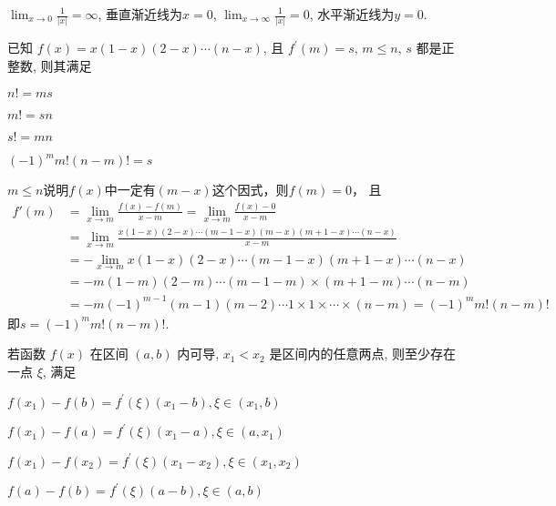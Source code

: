 \documentclass{USTBExam}
\begin{document}
\begin{analysis}
  $\lim _{x \to 0} \frac{1}{|x|} = \infty$, 垂直渐近线为$x=0$,
  $\lim _{x \to \infty} \frac{1}{|x|} = 0$, 水平渐近线为$y=0$.
\end{analysis}

\begin{problem}
  已知 $f(x)=x(1-x)(2-x) \cdots (n-x)$, 且 $f^{\prime}(m)=s$, $m \leq n$, $s$ 都是正整数, 则其满足
  \paren[D]
  \begin{choices}
    \item $n !=m s$
    \item $m !=s n$
    \item $s !=m n$
    \item $(-1)^{m} m !(n-m) !=s$
  \end{choices}
\end{problem}

\begin{analysis}
  $m \leq n$说明$f(x)$中一定有$(m-x)$这个因式，则$f(m) = 0$， 且
  \begin{align*}
    f'(m) & = \lim_{x \to m} \frac{f(x) - f(m)}{x - m}
    = \lim_{x \to m} \frac{f(x) - 0}{x - m}                                                    \\
          & = \lim_{x \to m} \frac{x(1-x)(2-x) \cdots (m-1-x)(m-x)(m+1-x) \cdots (n-x)}{x - m} \\
          & = - \lim_{x \to m} x(1-x)(2-x) \cdots (m-1-x) (m+1-x) \cdots (n-x)                 \\
          & = - m(1-m)(2-m) \cdots (m-1-m) \times (m+1-m) \cdots (n-m)                         \\
          & = - m (-1)^{m-1}(m-1)(m-2) \cdots 1 \times 1 \times \cdots \times (n-m)
    = (-1)^m m! (n-m)!
  \end{align*}
  即$s = (-1)^m m! (n-m)!$.
\end{analysis}

\begin{problem}
  若函数 $f(x)$ 在区间 $(a, b)$ 内可导, $x_{1}<x_{2}$ 是区间内的任意两点, 则至少存在一点 $\xi$, 满足
  \paren[C]
  \begin{choices}
    \item $f\left(x_{1}\right)-f(b)=f^{\prime}(\xi)\left(x_{1}-b\right), \xi \in\left(x_{1}, b\right)$
    \item $f\left(x_{1}\right)-f(a)=f^{\prime}(\xi)\left(x_{1}-a\right), \xi \in\left(a, x_{1}\right)$
    \item $f\left(x_{1}\right)-f\left(x_{2}\right)=f^{\prime}(\xi)\left(x_{1}-x_{2}\right), \xi \in\left(x_{1}, x_{2}\right)$
    \item $f(a)-f(b)=f^{\prime}(\xi)(a-b), \xi \in(a, b)$
  \end{choices}
\end{problem}
\end{document}
